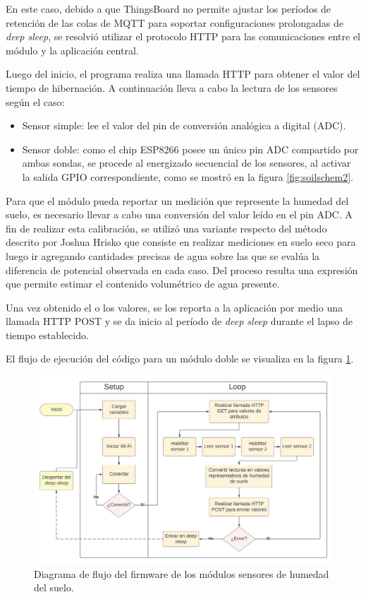 En este caso, debido a que ThingsBoard no permite ajustar los períodos de retención de las colas de MQTT para soportar configuraciones prolongadas de \textit{deep sleep}, se resolvió utilizar el protocolo HTTP para las comunicaciones entre el módulo y la aplicación central. 

Luego del inicio, el programa realiza una llamada HTTP para obtener el valor del tiempo de hibernación. A continuación lleva a cabo la lectura de los sensores según el caso:
\begin{itemize}
\item Sensor simple: lee el valor del pin de conversión analógica a digital (ADC).
\item Sensor doble: como el chip ESP8266 posee un único pin ADC compartido por ambas sondas, se procede al energizado secuencial de los sensores, al activar la salida GPIO correspondiente, como se mostró en la figura \ref{fig:soilschem2}. 

\end{itemize}


Para que el módulo pueda reportar un medición que represente la humedad del suelo, es necesario llevar a cabo una conversión del valor leído en el pin ADC. A fin de realizar esta calibración, se utilizó una variante respecto del método descrito por Joshua Hrisko \citep{soilcalibration} que consiste en realizar mediciones en suelo seco para luego ir agregando cantidades precisas de agua sobre las que se evalúa la diferencia de potencial observada en cada caso. Del proceso resulta una expresión que permite estimar el contenido volumétrico de agua presente.

Una vez obtenido el o los valores, se los reporta a la aplicación por medio una llamada HTTP POST y se da inicio al período de \textit{deep sleep} durante el lapso de tiempo establecido.

El flujo de ejecución del código para un módulo doble se visualiza en la figura \ref{fig:flow_soilsensor}.


\begin{figure}[!h]
	\centering
	\includegraphics[width=1\textwidth]{./Figures/chapter3/FirmwareSoilSensor.jpg}
	\caption[Diagrama de flujo del firmware de los módulos sensores de humedad del suelo]{Diagrama de flujo del firmware de los módulos sensores de humedad del suelo.}
	\label{fig:flow_soilsensor}
\end{figure}



